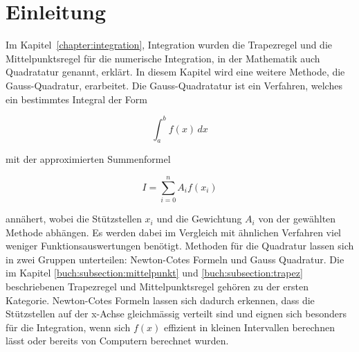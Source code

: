 %
%
%
\section{Einleitung\label{quadratur:section:einleitung}}

Im Kapitel~\ref{chapter:integration}, Integration wurden die 
Trapezregel und die Mittelpunktsregel für die numerische Integration, 
in der Mathematik auch Quadratatur genannt, erklärt. 
In diesem Kapitel wird eine weitere Methode, die Gauss-Quadratur, erarbeitet.
\noindent
Die Gauss-Quadratatur ist ein Verfahren, welches ein bestimmtes Integral der Form

\begin{equation}
    \int_{a}^{b} f(x) \,dx
\end{equation}

mit der approximierten Summenformel 

\begin{equation}
    I = \sum_{i=0}^{n} A_i f(x_i)
\end{equation}

annähert, wobei die Stützstellen $x_i$ und die Gewichtung $A_i$ von der gewählten 
Methode abhängen. 
Es werden dabei im Vergleich mit ähnlichen Verfahren viel weniger Funktionsauswertungen benötigt.
\noindent
Methoden für die Quadratur lassen sich in zwei Gruppen unterteilen: 
Newton-Cotes Formeln und Gauss Quadratur.
Die im Kapitel \ref{buch:subsection:mittelpunkt} und \ref{buch:subsection:trapez} beschriebenen
Trapezregel und Mittelpunktsregel gehören zu der ersten Kategorie.
Newton-Cotes Formeln lassen sich dadurch erkennen, dass die Stützstellen auf der x-Achse 
gleichmässig verteilt sind und eignen sich besonders für die Integration, wenn sich $f(x)$ 
effizient in kleinen Intervallen berechnen lässt oder bereits von Computern berechnet wurden.

\newpage





